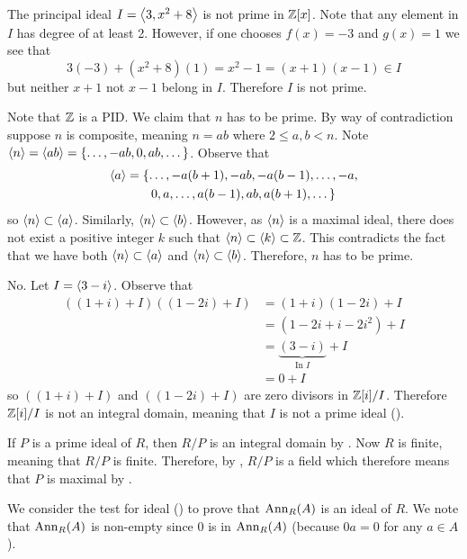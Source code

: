 \begin{questions}
    \item The principal ideal $I = \left\langle3, x^2+8\right\rangle$ is not prime in $\mathbb{Z}[x]$. Note that any element in $I$ has degree of at least 2. However, if one chooses $f(x) = -3$ and $g(x) = 1$ we see that
    \[
        3(-3) + (x^2+8)(1) = x^2 - 1 = (x+1)(x-1) \in I
    \]
    but neither $x+1$ not $x-1$ belong in $I$. Therefore $I$ is not prime.

    \item Note that $\mathbb{Z}$ is a PID. We claim that $n$ has to be prime. By way of contradiction suppose $n$ is composite, meaning $n = ab$ where $2 \leq a,b < n$. Note $\left\langle n\right\rangle = \left\langle ab\right\rangle = \{\dots, -ab, 0, ab, \dots\}$. Observe that
    \begin{align*}
        \left\langle a\right\rangle &= \{\dots, -a(b+1), -ab, -a(b-1), \dots, -a,\\
        &\quad\quad0, a, \dots, a(b-1), ab, a(b+1), \dots\}
    \end{align*}
    so $\left\langle n\right\rangle \subset \left\langle a\right\rangle$. Similarly, $\left\langle n\right\rangle \subset \left\langle b\right\rangle$. However, as $\left\langle n\right\rangle$ is a maximal ideal, there does not exist a positive integer $k$ such that $\left\langle n\right\rangle \subset \left\langle k\right\rangle \subset \mathbb{Z}$. This contradicts the fact that we have both $\left\langle n\right\rangle \subset \left\langle a\right\rangle$ and $\left\langle n\right\rangle \subset \left\langle b\right\rangle$. Therefore, $n$ has to be prime.

    \item No. Let $I = \left\langle3-i\right\rangle$. Observe that
    \begin{align*}
        ((1+i)+I)((1-2i)+I) &= (1+i)(1-2i) + I\\
        &= (1-2i+i-2i^2) + I\\
        &= \underbrace{(3 - i)}_{\text{In }I} + I\\
        &= 0 + I
    \end{align*}
    so $((1+i)+I)$ and $((1-2i)+I)$ are zero divisors in $\mathbb{Z}[i]/I$. Therefore $\mathbb{Z}[i]/I$ is not an integral domain, meaning that $I$ is not a prime ideal ().

    \item If $P$ is a prime ideal of $R$, then $R/P$ is an integral domain by . Now $R$ is finite, meaning that $R/P$ is finite. Therefore, by , $R/P$ is a field which therefore means that $P$ is maximal by .
    
    \item We consider the test for ideal () to prove that $\mathrm{Ann}_{R}(A)$ is an ideal of $R$. We note that $\mathrm{Ann}_{R}(A)$ is non-empty since 0 is in $\mathrm{Ann}_{R}(A)$ (because $0a = 0$ for any $a \in A$).


\end{questions}

